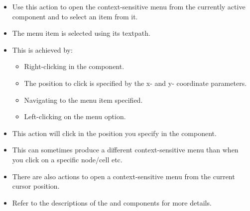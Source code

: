 
\begin{itemize}
\item Use this action to open the context-sensitive menu from the currently active component and to select an item from it.
\item The menu item is selected using its textpath. 
\item This is achieved by:
\begin{itemize}
\item Right-clicking in the component.
\item The position to click is specified by the x- and y- coordinate parameters.
\item Navigating to the menu item specified.
\item Left-clicking on the menu option.  
\end{itemize}
\item This action will click in the position you specify in the component.
\item This can sometimes produce a different context-sensitive menu than when you click on a specific node/cell etc.
\item There are also actions to open a context-sensitive menu from the current cursor position. 
\item Refer to the descriptions of the  and  components for more details. 

\end{itemize}

